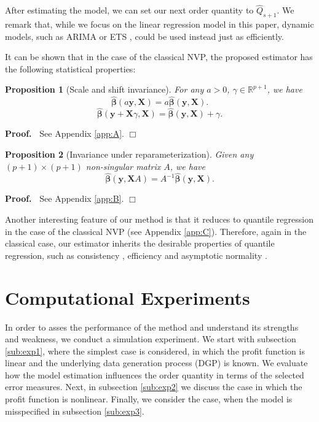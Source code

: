 \documentclass{article}
\newtheorem{proposition}{Proposition}
\newenvironment{proof}
 {\begin{trivlist} \item[] {\bf Proof.\ }}{\hfill$\Box$ \end{trivlist}}
\begin{document}
After estimating the model, we can set our next order quantity to $\hat{Q}_{s+1}$. We remark that, while we focus on the linear regression model in this paper, dynamic models, such as ARIMA or ETS \cite{HKO08}, could be used instead just as efficiently.

It can be shown that in the case of the classical NVP, the proposed estimator has the following statistical properties:
\begin{proposition}[Scale and shift invariance]
For any $a>0$, $\gamma\in \mathbb{R}^{p+1}$, we have
\[
    \hat{\boldsymbol{\beta}}(a\mathbf{y},\mathbf{X})=a\hat{\boldsymbol{\beta}}(\mathbf{y},\mathbf{X}).
\]
\[
    \hat{\boldsymbol{\beta}}(\mathbf{y}+\mathbf{X}\gamma,\mathbf{X})=
    \hat{\boldsymbol{\beta}}(\mathbf{y},\mathbf{X})+\gamma.
\]
\end{proposition}
\begin{proof}
See Appendix \ref{app:A}.
\end{proof}

\begin{proposition}[Invariance under reparameterization]
Given any $(p+1)\times (p+1)$ non-singular matrix $A$, we have
\[
        \hat{\boldsymbol{\beta}}(\mathbf{y},\mathbf{X}A)=A^{-1}\hat{\boldsymbol{\beta}}(\mathbf{y},\mathbf{X}).
\]
\end{proposition}
\begin{proof}
See Appendix \ref{app:B}.
\end{proof}

Another interesting feature of our method is that it reduces to quantile regression in the case of the classical NVP (see Appendix \ref{app:C}). Therefore, again in the classical case, our estimator
inherits the desirable properties of quantile regression, such as
consistency \cite{Koe05}, efficiency \cite{KM99} and asymptotic
normality \cite{KHM05}.

\section{Computational Experiments} \label{se:results}

In order to asses the performance of the method and understand its strengths and weakness, we conduct a simulation experiment. We start with subsection \ref{sub:exp1}, where the simplest case is considered, in which the profit function is linear and the underlying data generation process (DGP) is known. We evaluate how the model estimation influences the order quantity in terms of the selected error measures. Next, in subsection \ref{sub:exp2} we discuss the case in which the profit function is nonlinear. Finally, we consider the case, when the model is misspecified in subsection \ref{sub:exp3}.
\end{document}

